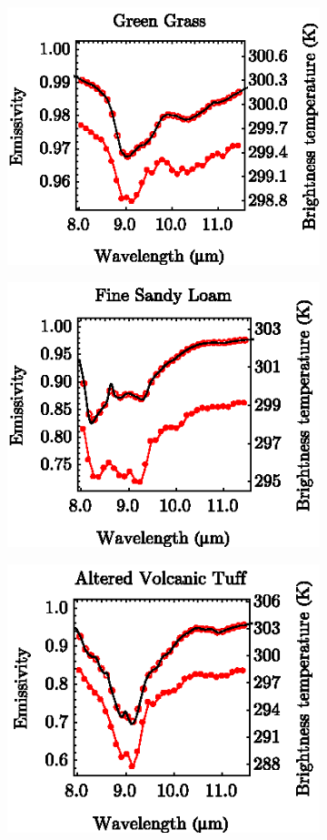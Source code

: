 \begin{figure}[!t]
	\centering
	\vspace{1em}
	\begin{subfigure}[t]{.3\linewidth}
		\centering
		\includegraphics[scale=1]{pics/Chapter_03/GreenGrass_Emiss_vs_BrightTemp.eps}
		\caption{}
	\end{subfigure}
	\hspace{1em}
	\begin{subfigure}[t]{.3\linewidth}
		\centering
		\includegraphics[scale=1]{pics/Chapter_03/FineSandyLoam_Emiss_vs_BrightTemp.eps}
		\caption{}
	\end{subfigure}
	\hspace{1em}
	\begin{subfigure}[t]{.3\linewidth}
		\centering
		\includegraphics[scale=1]{pics/Chapter_03/AlteredVolcanicTuff_Emiss_vs_BrightTemp.eps}

\end{subfigure}
\end{figure}
